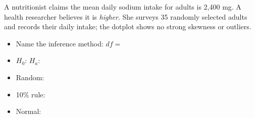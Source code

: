 \documentclass[10pt]{article}
\begin{document}
\begin{practicebox}
A nutritionist claims the mean daily sodium intake for adults is 2,400 mg. A health researcher
believes it is \emph{higher}. She surveys 35 randomly selected adults and records their daily
intake; the dotplot shows no strong skewness or outliers.

\begin{itemize}
  \item Name the inference method:  \quad $df = $ 
  \item $H_0$:  \quad $H_a$: 
  \item Random: 
  \item 10\% rule: 
  \item Normal: 
\end{itemize}
\end{practicebox}
\end{document}
